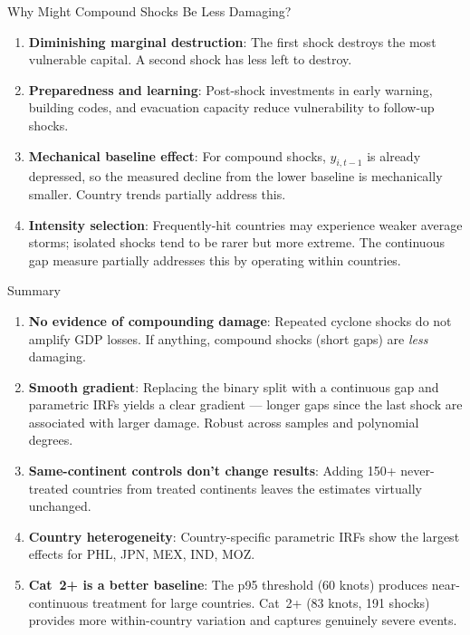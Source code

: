 \documentclass[aspectratio=169,c]{beamer}
\begin{document}
\begin{frame}{Why Might Compound Shocks Be Less Damaging?}
\begin{enumerate}
  \item \textbf{Diminishing marginal destruction}: The first shock destroys the most vulnerable capital. A second shock has less left to destroy.

  \medskip
  \item \textbf{Preparedness and learning}: Post-shock investments in early warning, building codes, and evacuation capacity reduce vulnerability to follow-up shocks.

  \medskip
  \item \textbf{Mechanical baseline effect}: For compound shocks, $y_{i,t-1}$ is already depressed, so the measured decline from the lower baseline is mechanically smaller. Country trends partially address this.

  \medskip
  \item \textbf{Intensity selection}: Frequently-hit countries may experience weaker average storms; isolated shocks tend to be rarer but more extreme. The continuous gap measure partially addresses this by operating within countries.
\end{enumerate}
\end{frame}

\begin{frame}{Summary}
\begin{enumerate}
  \item \textbf{No evidence of compounding damage}: Repeated cyclone shocks do not amplify GDP losses. If anything, compound shocks (short gaps) are \emph{less} damaging.

  \medskip
  \item \textbf{Smooth gradient}: Replacing the binary split with a continuous gap and parametric IRFs yields a clear gradient --- longer gaps since the last shock are associated with larger damage. Robust across samples and polynomial degrees.

  \medskip
  \item \textbf{Same-continent controls don't change results}: Adding 150+ never-treated countries from treated continents leaves the estimates virtually unchanged.

  \medskip
  \item \textbf{Country heterogeneity}: Country-specific parametric IRFs show the largest effects for PHL, JPN, MEX, IND, MOZ.

  \medskip
  \item \textbf{Cat~2+ is a better baseline}: The p95 threshold (60 knots) produces near-continuous treatment for large countries. Cat~2+ (83 knots, 191 shocks) provides more within-country variation and captures genuinely severe events.
\end{enumerate}
\end{frame}
\end{document}
